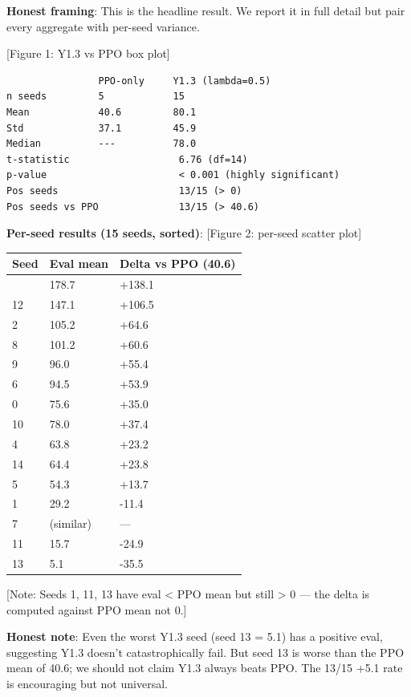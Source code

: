\documentclass[
]{article}
\newcounter{none} %
\begin{document}
\textbf{Honest framing}: This is the headline result. We report it in
full detail but pair every aggregate with per-seed variance.

{[}Figure 1: Y1.3 vs PPO box plot{]}

\begin{verbatim}
                PPO-only     Y1.3 (lambda=0.5)
n seeds         5            15
Mean            40.6         80.1
Std             37.1         45.9
Median          ---          78.0
t-statistic                   6.76 (df=14)
p-value                       < 0.001 (highly significant)
Pos seeds                     13/15 (> 0)
Pos seeds vs PPO              13/15 (> 40.6)
\end{verbatim}

\textbf{Per-seed results (15 seeds, sorted)}: {[}Figure 2: per-seed
scatter plot{]}

{\def\LTcaptype{none} %
\begin{longtable}[]{@{}lll@{}}
\toprule\noalign{}
Seed & Eval mean & Delta vs PPO (40.6) \\
\midrule\noalign{}
\endhead
\bottomrule\noalign{}
\endlastfoot
3 & 178.7 & +138.1 \\
12 & 147.1 & +106.5 \\
2 & 105.2 & +64.6 \\
8 & 101.2 & +60.6 \\
9 & 96.0 & +55.4 \\
6 & 94.5 & +53.9 \\
0 & 75.6 & +35.0 \\
10 & 78.0 & +37.4 \\
4 & 63.8 & +23.2 \\
14 & 64.4 & +23.8 \\
5 & 54.3 & +13.7 \\
1 & 29.2 & -11.4 \\
7 & (similar) & --- \\
11 & 15.7 & -24.9 \\
13 & 5.1 & -35.5 \\
\end{longtable}
}

{[}Note: Seeds 1, 11, 13 have eval \textless{} PPO mean but still
\textgreater{} 0 --- the delta is computed against PPO mean not 0.{]}

\textbf{Honest note}: Even the worst Y1.3 seed (seed 13 = 5.1) has a
positive eval, suggesting Y1.3 doesn't catastrophically fail. But seed
13 is worse than the PPO mean of 40.6; we should not claim Y1.3 always
beats PPO. The 13/15 +5.1 rate is encouraging but not universal.
\end{document}

